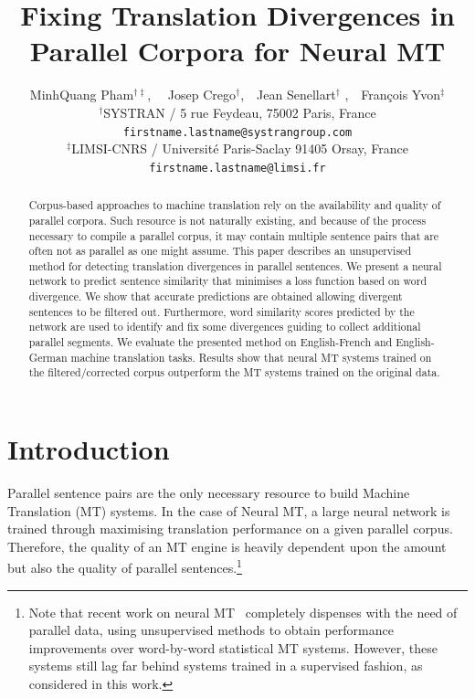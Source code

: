 \documentclass[11pt,a4paper]{article}
\title{Fixing Translation Divergences in Parallel Corpora for Neural MT}
\author{MinhQuang Pham$^{\dag\ddag}$, \ \ Josep Crego$^\dag$,\ \ Jean Senellart$^\dag$ ,\ \ Fran\c cois Yvon$^\ddag$\\
  $^\dag$SYSTRAN / 5 rue Feydeau, 75002 Paris, France\\
  {\tt firstname.lastname@systrangroup.com}\\
  $^\ddag$LIMSI-CNRS / Universit\'e Paris-Saclay 91405 Orsay, France\\
  {\tt firstname.lastname@limsi.fr}}
\date{}
\begin{document}
\maketitle
\begin{abstract}


Corpus-based approaches to machine translation rely on the availability and quality of parallel corpora.
Such resource is not naturally existing, and because of the process necessary to compile a parallel corpus, it may contain multiple sentence pairs that are often not as parallel as one might assume.
This paper describes an unsupervised method for detecting translation divergences in parallel sentences.
We present a neural network to predict sentence similarity that minimises a loss function based on word divergence.
We show that accurate predictions are obtained allowing divergent sentences to be filtered out.
Furthermore, word similarity scores predicted by the network are used to identify and fix some divergences guiding to collect additional parallel segments.
We evaluate the presented method on  English-French and  English-German machine translation tasks.
Results show that neural MT systems trained on the filtered/corrected corpus outperform the MT systems trained on the original data.


\end{abstract}

\section{Introduction}

Parallel sentence pairs are the only necessary resource to build Machine Translation (MT) systems. 
In the case of Neural MT, a large neural network is trained through maximising translation performance on a given parallel corpus. 
Therefore, the quality of an MT engine is heavily dependent upon the amount but also the quality of parallel sentences.\footnote{Note that  recent work on neural MT~\cite{lample2018word,artetxe2018iclr} completely dispenses with the need of parallel data, using unsupervised methods to obtain performance improvements over word-by-word statistical MT systems. However, these systems still lag far behind systems trained in a supervised fashion, as considered in this work.} 
\end{document}

